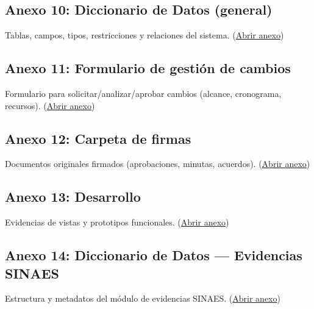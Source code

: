 \subsection*{Anexo 10: Diccionario de Datos (general)}
\label{anexo:diccionario_general}
\parbox{\linewidth}{%
Tablas, campos, tipos, restricciones y relaciones del sistema.
(\href{https://drive.google.com/file/d/1sHDwVC5bjJg16aMmE7ue0gawE14cJS49/view?usp=sharing}{Abrir anexo})
}

\subsection*{Anexo 11: Formulario de gestión de cambios}
\label{anexo:formulario_gestion_de_cambios}
\parbox{\linewidth}{%
Formulario para solicitar/analizar/aprobar cambios (alcance, cronograma, recursos).
(\href{https://drive.google.com/file/d/1LlylabUQ4ncxDJ_cMAvHNNz0IbQ720eB/view?usp=sharing}{Abrir anexo})
}

\subsection*{Anexo 12: Carpeta de firmas}
\label{anexo:carpeta_firmas}
\parbox{\linewidth}{%
Documentos originales firmados (aprobaciones, minutas, acuerdos).
(\href{https://drive.google.com/drive/folders/1RyhaHzP8_-uZjUJkA3g5nfkAvk997w2Y?usp=sharing}{Abrir anexo})
}

\subsection*{Anexo 13: Desarrollo}
\label{anexo:desarrollo}
\parbox{\linewidth}{%
Evidencias de vistas y prototipos funcionales.
(\href{https://drive.google.com/drive/folders/1Gh8xDngg0TndL0D7ia3ZEBqxs9TuCOrf?usp=sharing}{Abrir anexo})
}

\subsection*{Anexo 14: Diccionario de Datos — Evidencias SINAES}
\label{anexo:dicc_evidencias}
\parbox{\linewidth}{%
Estructura y metadatos del módulo de evidencias SINAES.
(\href{https://drive.google.com/file/d/1aWdZiAq-vZ_1Ty9TgkDgT_mCuPRHtm_o/view?usp=drive_link}{Abrir anexo})
}

